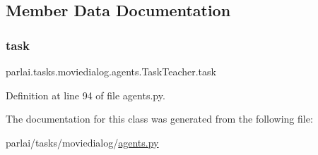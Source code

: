 \subsection{Member Data Documentation}
\mbox{\label{classparlai_1_1tasks_1_1moviedialog_1_1agents_1_1TaskTeacher_a415ac0cd746556273a07ea8967ed30db}} 
\subsubsection{\texorpdfstring{task}{task}}
{\footnotesize\ttfamily parlai.\+tasks.\+moviedialog.\+agents.\+Task\+Teacher.\+task}



Definition at line 94 of file agents.\+py.



The documentation for this class was generated from the following file\+:\begin{DoxyCompactItemize}
\item 
parlai/tasks/moviedialog/\hyperlink{parlai_2tasks_2moviedialog_2agents_8py}{agents.\+py}\end{DoxyCompactItemize}
